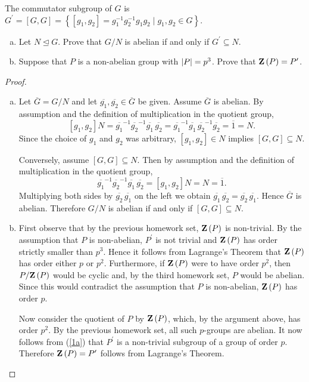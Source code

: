 \documentclass[10pt]{amsart}
\begin{document}
\begin{thm}
  The commutator subgroup of $G$ is $G^{\prime} = [G,G] = \left\{[g_1,g_2] = g_1^{-1}g_2^{-1}g_1g_2 \mid g_1,g_2 \in G\right\}$.
  \begin{enumerate}[(a)]
  \item
    Let $N \unlhd G$.  Prove that $G/N$ is abelian if and only if $G^\prime \subseteq N$.
  \item
    Suppose that $P$ is a non-abelian group with $\left| P \right| = p^3$.
    Prove that $\mathbf{Z}\left(P\right) = P^\prime$.
  \end{enumerate}
  \begin{proof}
    \begin{enumerate}[(a)]
    \item\label{1a}
      Let $\overline{G} = G/N$ and let $\overline{g_1}, \overline{g_2} \in \overline{G}$ be given.
      Assume $\overline{G}$ is abelian.
      By assumption and the definition of multiplication in the quotient group, $$[g_1,g_2]N = \overline{g_1}^{-1}\overline{g_2}^{-1}\overline{g_1}\,\overline{g_2} = \overline{g_1}^{-1}\overline{g_1}\,\overline{g_2}^{-1}\overline{g_2} = \overline{1} = N.$$
      Since the choice of $g_1$ and $g_2$ was arbitrary, $[g_1,g_2] \in N$ implies $[G,G] \subseteq N$.
      
      Conversely, assume $[G,G] \subseteq N$.
      Then by assumption and the definition of multiplication in the quotient group, $$\overline{g_1}^{-1}\overline{g_2}^{-1}\overline{g_1}\,\overline{g_2} = [g_1,g_2]N = N = \overline{1}.$$
      Multiplying both sides by $\overline{g_2}\,\overline{g_1}$ on the left we obtain $\overline{g_1}\,\overline{g_2} = \overline{g_2}\,\overline{g_1}$.
      Hence $\overline{G}$ is abelian.
      Therefore $G/N$ is abelian if and only if $[G,G] \subseteq N$.
    \item
      First observe that by the previous homework set, $\mathbf{Z}\left(P\right)$ is non-trivial. 
      By the assumption that $P$ is non-abelian, $P^\prime$ is not trivial and $\mathbf{Z}\left(P\right)$ has order strictly smaller than $p^3$.
      Hence it follows from Lagrange's Theorem that $\mathbf{Z}\left(P\right)$ has order either $p$ or $p^2$.
      Furthermore, if $\mathbf{Z}\left(P\right)$ were to have order $p^2$, then $P/\mathbf{Z}\left(P\right)$ would be cyclic and, by the third homework set, $P$ would be abelian.
      Since this would contradict the assumption that $P$ is non-abelian, $\mathbf{Z}\left(P\right)$ has order $p$.
      
      Now consider the quotient of $P$ by $\mathbf{Z}\left(P\right)$, which, by the argument above, has order $p^2$.
      By the previous homework set, all such $p$-groups are abelian.
      It now follows from (\ref{1a}) that $P^\prime$ is a non-trivial subgroup of a group of order $p$.
      Therefore $\mathbf{Z}\left(P\right) = P^\prime$ follows from Lagrange's Theorem.
    \end{enumerate}
  \end{proof}
\end{thm}
\end{document}
